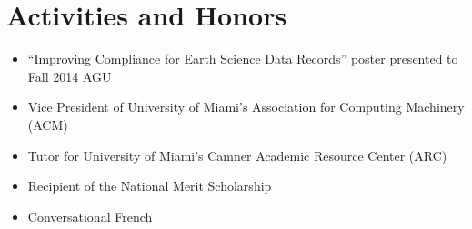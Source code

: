 \documentclass[letterpaper,12pt]{article}
\begin{document}
\vskip 3.5mm

\section*{Activities and Honors}
\begin{itemize}
  \item \href{https://oychang.com/research/jpl/compliance-checker-poster.pdf}{``Improving Compliance for Earth Science Data Records''} poster presented to Fall 2014 AGU
  \item Vice President of University of Miami's Association for Computing Machinery (ACM)
  \item Tutor for University of Miami's Camner Academic Resource Center (ARC)
  \item Recipient of the National Merit Scholarship
  \item Conversational French
\end{itemize}
\end{document}
